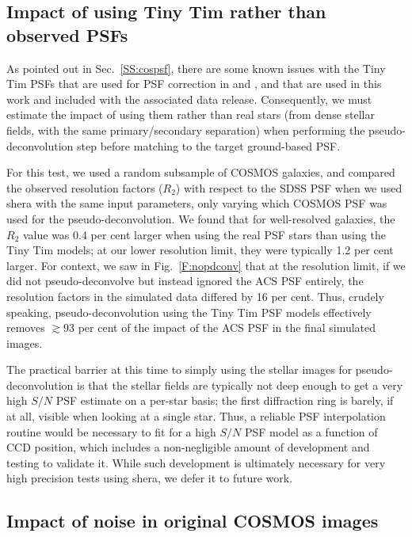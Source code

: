 \documentclass[twocolumn,useAMS,usenatbib]{mn2e}
\newcommand{\newtext}{}
\begin{document}
\subsection{Impact of using Tiny Tim rather than observed PSFs}\label{SS:testtinytim}

\newtext{As pointed out in Sec.~\ref{SS:cospsf}, there are some known
  issues with the Tiny Tim PSFs that are used for PSF correction in
  \cite{2007ApJS..172..219L} and \cite{2007MNRAS.376...13M}, and that
  are used in this work and included with the associated data
  release.  Consequently, we must estimate the impact of using them
  rather than real stars (from dense stellar fields, with the same
  primary/secondary separation) when performing the
  pseudo-deconvolution step before matching to the target ground-based
  PSF.}

\newtext{For this test, we used a random subsample of COSMOS galaxies,
  and compared the observed resolution factors ($R_2$) with respect to
  the SDSS PSF when we used {\sc shera} with the same input
  parameters, only varying which COSMOS PSF was used for the
  pseudo-deconvolution.  We found that for well-resolved galaxies, the
  $R_2$ value was 0.4 per cent larger when using the real PSF stars
  than using the Tiny Tim models; at our lower resolution limit, they
  were typically 1.2 per cent larger.  For context, we saw in
  Fig.~\ref{F:nopdconv} that at the resolution limit, if we did not
  pseudo-deconvolve but instead ignored the ACS PSF entirely, the
  resolution factors in the simulated data differed by 16 per cent.
  Thus, crudely speaking, pseudo-deconvolution using the Tiny Tim PSF models effectively
removes $\gtrsim 93$ per cent of the impact of the ACS PSF in the final
simulated images.}

\newtext{The practical barrier at this time to simply using the
  stellar images for pseudo-deconvolution is that the stellar fields
  are typically not deep enough to get a very high $S/N$ PSF estimate
  on a per-star basis; the first diffraction ring is barely, if at
  all, visible when looking at a single star.  Thus, a reliable PSF
  interpolation routine would be necessary to fit for a high $S/N$ PSF
  model as a function of CCD position, which includes a non-negligible
  amount of development and testing to validate it.  While such
  development is ultimately necessary for very high precision tests
  using {\sc shera}, we defer it to future work.}

\subsection{Impact of noise in original COSMOS images}\label{SS:cosnoise}
\end{document}
